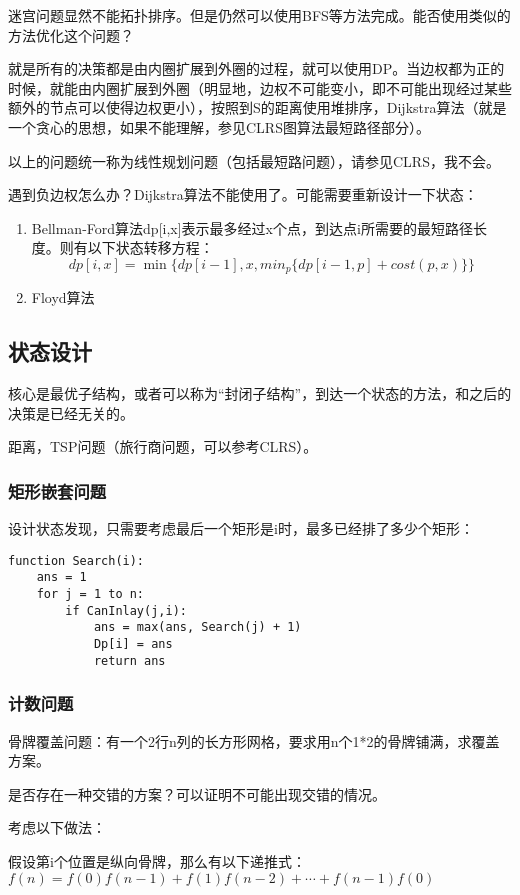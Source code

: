 \documentclass{article}
\begin{document}
迷宫问题显然不能拓扑排序。但是仍然可以使用BFS等方法完成。能否使用类似的方法优化这个问题？

就是所有的决策都是由内圈扩展到外圈的过程，就可以使用DP。当边权都为正的时候，就能由内圈扩展到外圈（明显地，边权不可能变小，即不可能出现经过某些额外的节点可以使得边权更小），按照到S的距离使用堆排序，Dijkstra算法（就是一个贪心的思想，如果不能理解，参见CLRS图算法最短路径部分）。

以上的问题统一称为线性规划问题（包括最短路问题），请参见CLRS，我不会。

遇到负边权怎么办？Dijkstra算法不能使用了。可能需要重新设计一下状态：
\begin{enumerate}
\item{Bellman-Ford算法}dp[i,x]表示最多经过x个点，到达点i所需要的最短路径长度。则有以下状态转移方程：
\begin{equation*}
dp[i,x]=\min\{dp[i-1],x,min_p\{dp[i-1,p]+cost(p,x)\}\}
\end{equation*}
\item{Floyd算法}
\end{enumerate}
\subsection{状态设计}
核心是最优子结构，或者可以称为“封闭子结构”，到达一个状态的方法，和之后的决策是已经无关的。

距离，TSP问题（旅行商问题，可以参考CLRS）。
\subsubsection{矩形嵌套问题}
设计状态发现，只需要考虑最后一个矩形是i时，最多已经排了多少个矩形：
\begin{verbatim}
function Search(i):
    ans = 1
    for j = 1 to n:
        if CanInlay(j,i):
            ans = max(ans, Search(j) + 1)
            Dp[i] = ans
            return ans
\end{verbatim}
\subsubsection{计数问题}
骨牌覆盖问题：有一个2行n列的长方形网格，要求用n个1*2的骨牌铺满，求覆盖方案。

是否存在一种交错的方案？可以证明不可能出现交错的情况。

考虑以下做法：

假设第i个位置是纵向骨牌，那么有以下递推式：
$f(n)=f(0)f(n-1)+f(1)f(n-2)+\cdots+f(n-1)f(0)$
\end{document}
